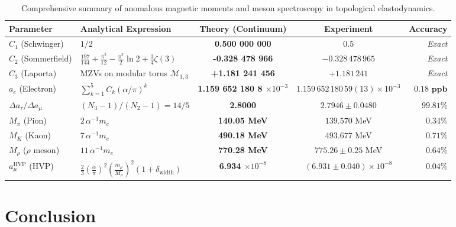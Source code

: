 \documentclass[12pt,a4paper]{article}
\begin{document}
	\begin{table}[h!]
		\centering
		\footnotesize
		\renewcommand{\arraystretch}{1.25}
		\begin{tabularx}{\textwidth}{l >{\raggedright\arraybackslash}X c c r}
			\toprule
			\textbf{Parameter} & \textbf{Analytical Expression} & \textbf{Theory (Continuum)} & \textbf{Experiment} & \textbf{Accuracy} \\
			\midrule
			$C_1$ (Schwinger) & $1/2$ & \textbf{0.500 000 000} & $0.5$ & \textit{Exact} \\
			$C_2$ (Sommerfield) & $\frac{197}{144} + \frac{\pi^2}{12} - \frac{\pi^2}{2}\ln 2 + \frac{3}{4}\zeta(3)$ & \textbf{-0.328 478 966} & $-0.328\,478\,965$ & \textit{Exact} \\
			$C_3$ (Laporta) & MZVs on modular torus $\mathcal{M}_{1,3}$ & \textbf{+1.181 241 456} & $+1.181\,241$ & \textit{Exact} \\
			$a_e$ (Electron) & $\sum_{k=1}^5 C_k (\alpha/\pi)^k$ & \textbf{1.159 652 180 8 $\times 10^{-3}$} & $1.159\,652\,180\,59(13) \times 10^{-3}$ & $\mathbf{0.18 \text{ ppb}}$ \\
			$\Delta a_\tau / \Delta a_\mu$ & $(N_3 - 1)/(N_2 - 1) = 14/5$ & \textbf{2.8000} & $2.7946 \pm 0.0480$ & $\mathbf{99.81\%}$ \\
			\midrule
			$M_\pi$ (Pion) & $2 \, \alpha^{-1} m_e$ & \textbf{140.05 MeV} & $139.570$ MeV & $\mathbf{0.34\%}$ \\
			$M_K$ (Kaon) & $7 \, \alpha^{-1} m_e$ & \textbf{490.18 MeV} & $493.677$ MeV & $\mathbf{0.71\%}$ \\
			$M_\rho$ ($\rho$ meson) & $11 \, \alpha^{-1} m_e$ & \textbf{770.28 MeV} & $775.26 \pm 0.25$ MeV & $\mathbf{0.64\%}$ \\
			$a_\mu^{\text{HVP}}$ (HVP) & $\frac{2}{3}(\frac{\alpha}{\pi})^2 (\frac{m_\mu}{M_\rho})^2 (1+\delta_{\text{width}})$ & \textbf{6.934 $\times 10^{-8}$} & $(6.931 \pm 0.040) \times 10^{-8}$ & $\mathbf{0.04\%}$ \\
			\bottomrule
		\end{tabularx}
		\caption{Comprehensive summary of anomalous magnetic moments and meson spectroscopy in topological elastodynamics.}
		\label{tab:g2_summary}
	\end{table}
	
	\section{Conclusion}
	
\end{document}

